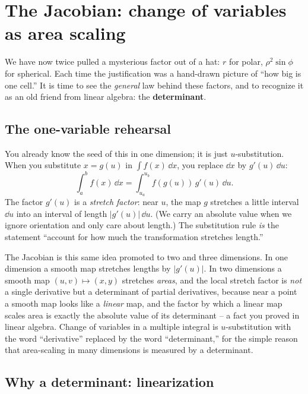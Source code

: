 \section{The Jacobian: change of variables as area scaling}
\label{ch34:jacobian}

We have now twice pulled a mysterious factor out of a hat: $r$ for polar,
$\rho^2\sin\phi$ for spherical. Each time the justification was a hand-drawn
picture of ``how big is one cell.'' It is time to see the \emph{general} law
behind these factors, and to recognize it as an old friend from linear algebra:
the \textbf{determinant}.

\subsection{The one-variable rehearsal}

You already know the seed of this in one dimension; it is just $u$-substitution.
When you substitute $x=g(u)$ in $\int f(x)\,\dd x$, you replace
$\dd x$ by $g'(u)\,\dd u$:
\[
  \int_a^b f(x)\,\dd x=\int_{u_a}^{u_b} f(g(u))\,g'(u)\,\dd u .
\]
The factor $g'(u)$ is a \emph{stretch factor}: near $u$, the map $g$ stretches a
little interval $\dd u$ into an interval of length $|g'(u)|\,\dd u$. (We carry an
absolute value when we ignore orientation and only care about length.) The
substitution rule \emph{is} the statement ``account for how much the
transformation stretches length.''

\begin{whybox}
The Jacobian is this same idea promoted to two and three dimensions. In one
dimension a smooth map stretches lengths by $|g'(u)|$. In two dimensions a smooth
map $(u,v)\mapsto(x,y)$ stretches \emph{areas}, and the local stretch factor is
\emph{not} a single derivative but a determinant of partial derivatives, because
near a point a smooth map looks like a \emph{linear} map, and the factor by which
a linear map scales area is exactly the absolute value of its determinant -- a
fact you proved in linear algebra. Change of variables in a multiple integral is
$u$-substitution with the word ``derivative'' replaced by the word
``determinant,'' for the simple reason that area-scaling in many dimensions is
measured by a determinant.
\end{whybox}

\subsection{Why a determinant: linearization}

